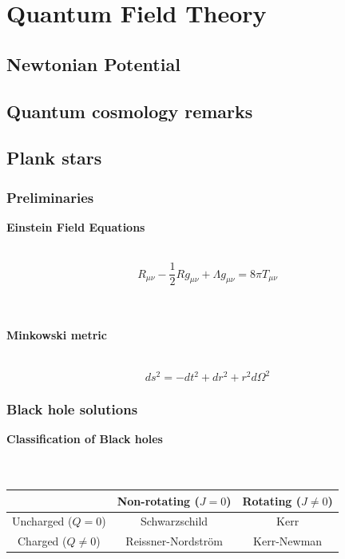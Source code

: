 \documentclass{beamer}
\begin{document}
\section{Quantum Field Theory}

\subsection{Newtonian Potential}
\subsection{Quantum cosmology remarks}
\subsection{Plank stars}





\begin{frame}
\frametitle{Preliminaries}

\textbf{Einstein Field Equations} \\\

\begin{equation}
\label{field}
R_{\mu \nu} - \frac{1}{2} R g_{\mu \nu} + \Lambda g_{\mu \nu} = 8 \pi T_{\mu \nu}
\end{equation}

\
\\
\
\\

\textbf{Minkowski metric} \\\

\begin{equation}
\label{mink}
ds^2 = -dt^2 + dr^2 + r^2d\Omega ^2
\end{equation}


\end{frame}


\begin{frame}
\frametitle{Black hole solutions}

\textbf{Classification of Black holes}\\\
\\\


\begin{center}
  \begin{tabular}{| c | c | c |}
    \hline
     & Non-rotating ($J=0$) & Rotating ($J\neq 0$)\\ \hline
    Uncharged ($Q =0 $) & Schwarzschild & Kerr \\ \hline
    Charged ($Q \neq 0$) & Reissner-Nordstr\"om & Kerr-Newman \\
    \hline
  \end{tabular}
\end{center}


\end{frame}
\end{document}
